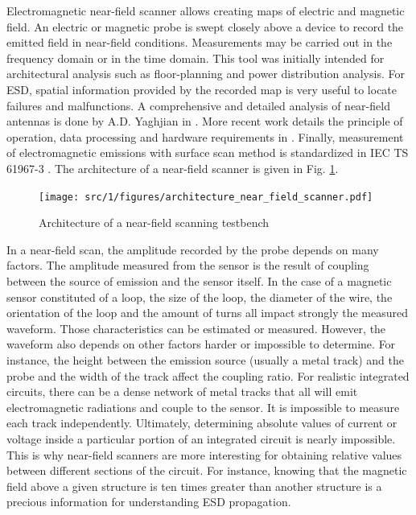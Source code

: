 Electromagnetic near-field scanner allows creating maps of electric and magnetic field.
An electric or magnetic probe is swept closely above a device to record the emitted field in near-field conditions.
Measurements may be carried out in the frequency domain or in the time domain.
This tool was initially intended for architectural analysis such as floor-planning and power distribution analysis.
For ESD, spatial information provided by the recorded map is very useful to locate failures and malfunctions.
A comprehensive and detailed analysis of near-field antennas is done by A.D. Yaghjian in \cite{nfsFirstStudy}.
More recent work details the principle of operation, data processing and hardware requirements in \cite{near-field-scan, planarNFSAntenna, NFSMeasurements, NFScanner}.
Finally, measurement of electromagnetic emissions with surface scan method is standardized in IEC TS 61967-3 \cite{iec61967}.
The architecture of a near-field scanner is given in Fig. \ref{fig:near-field-scanner}.

\begin{figure}[!h]
  \centering
  \texttt{[image: src/1/figures/architecture\_near\_field\_scanner.pdf]}
  \caption{Architecture of a near-field scanning testbench}
  \label{fig:near-field-scanner}
\end{figure}



In a near-field scan, the amplitude recorded by the probe depends on many factors.
The amplitude measured from the sensor is the result of coupling between the source of emission and the sensor itself.
In the case of a magnetic sensor constituted of a loop, the size of the loop, the diameter of the wire, the orientation of the loop and the amount of turns all impact strongly the measured waveform.
Those characteristics can be estimated or measured.
However, the waveform also depends on other factors harder or impossible to determine.
For instance, the height between the emission source (usually a metal track) and the probe and the width of the track affect the coupling ratio.
For realistic integrated circuits, there can be a dense network of metal tracks that all will emit electromagnetic radiations and couple to the sensor.
It is impossible to measure each track independently.
Ultimately, determining absolute values of current or voltage inside a particular portion of an integrated circuit is nearly impossible.
This is why near-field scanners are more interesting for obtaining relative values between different sections of the circuit.
For instance, knowing that the magnetic field above a given structure is ten times greater than another structure is a precious information for understanding ESD propagation.

